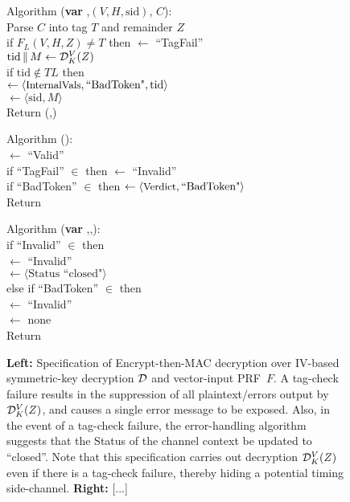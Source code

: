\begin{figure}
{\medskip
Algorithm ({\bf var} ,$(V,H,\mathrm{sid})$, $C$):\\
\nudge Parse $C$ into tag $T$ and remainder $Z$\\ 
\nudge if $F_L(V,H,Z) \neq T$ then  $\gets$ ``TagFail''\\
\nudge $\mathrm{tid} \,\|\, M \gets \mathcal{D}_K^{V}(Z)$\\
\nudge if $\mathrm{tid}\not\in TL$ then\\
\nudge\nudge {} $\gets \langle
\textrm{\small InternalVals}, \mbox{``BadToken"}, \mathrm{tid} \rangle$\\
\nudge {} $\gets \langle \mathrm{sid}, M \rangle$\\
\nudge Return (,)

\medskip
Algorithm ():\\
\nudge {} $\gets$ ``Valid''\\
\nudge if ``TagFail'' $\in$  then  $\gets$ ``Invalid''\\
\nudge if ``BadToken'' $\in$  then  $\gets \langle
\textrm{\small Verdict},\mbox{``BadToken"} \rangle$\\
\nudge Return 

\medskip
Algorithm ({\bf var} ,,):\\
\nudge if ``Invalid'' $\in$  then \\
\nudge\nudge {} $\gets$ ``Invalid'' \\
\nudge\nudge {} $\gets \langle
\mbox{Status ``closed"} \rangle$\\
\nudge else if ``BadToken'' $\in$  then \\
\nudge\nudge {} $\gets$ ``Invalid'' \\
\nudge\nudge {} $\gets$ none \\
\nudge Return 
} 
\caption{ {\bf
    Left:} Specification of Encrypt-then-MAC decryption over IV-based
  symmetric-key decryption $\mathcal{D}$ and vector-input PRF~$F$. A tag-check failure results in the
suppression of all plaintext/errors output by $\mathcal{D}^V_K(Z)$, and
causes a single error message to be exposed.  Also,
in the event of a tag-check failure, the error-handling algorithm
suggests that the Status of the channel context be updated to
``closed''.  Note that this specification carries out decryption
$\mathcal{D}^V_K(Z)$ even if there is a tag-check failure, thereby hiding a
potential timing side-channel. 
%
{\bf
  Right: } [...]
}
\label{fig:EtM-aead}
\end{figure}
